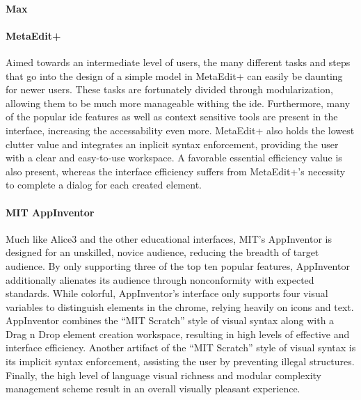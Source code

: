 \paragraph{Max}

\paragraph{MetaEdit+} Aimed towards an intermediate level of users, the many different tasks and steps that go into the design of a simple model in MetaEdit+ can easily be daunting for newer users.  These tasks are fortunately divided through modularization, allowing them to be much more manageable withing the \ac{ide}. Furthermore, many of the popular \ac{ide} features as well as context sensitive tools are present in the interface, increasing the accessability even more. MetaEdit+ also holds the lowest clutter value and integrates an inplicit syntax enforcement, providing the user with a clear and easy-to-use workspace. A favorable essential efficiency value is also present, whereas the interface efficiency suffers from MetaEdit+'s necessity to complete a dialog for each created element.

\paragraph{MIT AppInventor} Much like Alice3 and the other educational
interfaces, MIT's AppInventor is designed for an unskilled, novice
audience, reducing the breadth of target audience. By only supporting three
of the top ten popular features, AppInventor additionally alienates its
audience through nonconformity with expected standards. While colorful,
AppInventor's interface only supports four visual variables to distinguish
elements in the chrome, relying heavily on icons and text. AppInventor
combines the ``MIT Scratch'' style of visual syntax along with a Drag n
Drop element creation workspace, resulting in high levels of effective and
interface efficiency. Another artifact of the ``MIT Scratch'' style of
visual syntax is its implicit syntax enforcement, assisting the user by
preventing illegal structures. Finally, the high level of language visual
richness and modular complexity management scheme result in an overall
visually pleasant experience.

